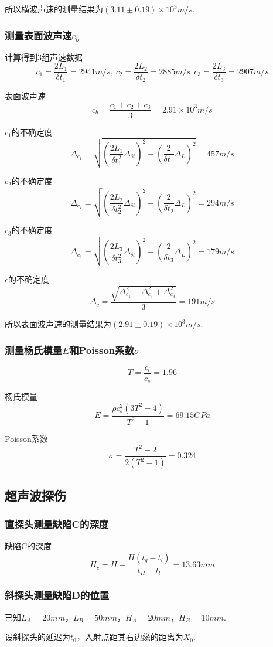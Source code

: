 \documentclass{thureport}
\begin{document}
所以横波声速的测量结果为$(3.11\pm0.19)\times10^3m/s$.

\subsubsection{测量表面波声速$c_b$}
计算得到3组声速数据
$$c_1=\frac{2L_1}{\delta t_1}=2941m/s,\ c_2=\frac{2L_2}{\delta t_2}=2885m/s, c_3=\frac{2L_3}{\delta t_3}=2907m/s$$

表面波声速
$$c_b=\frac{c_1+c_2+c_3}{3}=2.91\times10^3m/s$$

$c_1$的不确定度
$$\Delta_{c_1}=\sqrt{(\frac{2L_1}{\delta t_1^2}\Delta_{\delta t})^2+(\frac{2}{\delta t_1}\Delta_L)^2}=457m/s$$

$c_2$的不确定度
$$\Delta_{c_2}=\sqrt{(\frac{2L_2}{\delta t_2^2}\Delta_{\delta t})^2+(\frac{2}{\delta t_2}\Delta_L)^2}=294m/s$$

$c_3$的不确定度
$$\Delta_{c_3}=\sqrt{(\frac{2L_3}{\delta t_3^2}\Delta_{\delta t})^2+(\frac{2}{\delta t_3}\Delta_L)^2}=179m/s$$

$c$的不确定度
$$\Delta_c=\frac{\sqrt{\Delta_{c_1}^2+\Delta_{c_3}^2+\Delta_{c_3}^2}}{3}=191m/s$$

所以表面波声速的测量结果为$(2.91\pm0.19)\times10^3m/s$.

\subsubsection{测量杨氏模量$E$和Poisson系数$\sigma$}
$$T=\frac{c_l}{c_s}=1.96$$

杨氏模量
$$E=\frac{\rho c_s^2(3T^2-4)}{T^2-1}=69.15GPa$$

Poisson系数
$$\sigma=\frac{T^2-2}{2(T^2-1)}=0.324$$

\subsection{超声波探伤}
\subsubsection{直探头测量缺陷C的深度}
缺陷C的深度
$$H_c=H-\frac{H(t_q-t_l)}{t_H-t_l}=13.63mm$$

\subsubsection{斜探头测量缺陷D的位置}
已知$L_A=20mm$，$L_B=50mm$，$H_A=20mm$，$H_B=10mm$.

设斜探头的延迟为$t_0$，入射点距其右边缘的距离为$X_0$.
\end{document}

